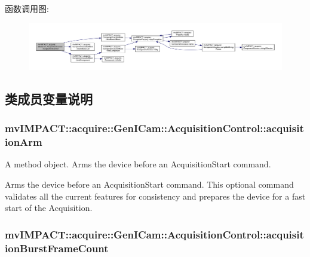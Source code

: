 函数调用图\+:
\nopagebreak
\begin{figure}[H]
\begin{center}
\leavevmode
\includegraphics[width=350pt]{classmv_i_m_p_a_c_t_1_1acquire_1_1_gen_i_cam_1_1_acquisition_control_a66a96d4ef8ec636ed0830bb8e5c94ca8_cgraph}
\end{center}
\end{figure}




\subsection{类成员变量说明}
\hypertarget{classmv_i_m_p_a_c_t_1_1acquire_1_1_gen_i_cam_1_1_acquisition_control_a05def6315f448a15576cb0746f791b26}{
\subsubsection[{acquisition\+Arm}]{ mv\+I\+M\+P\+A\+C\+T\+::acquire\+::\+Gen\+I\+Cam\+::\+Acquisition\+Control\+::acquisition\+Arm}}\label{classmv_i_m_p_a_c_t_1_1acquire_1_1_gen_i_cam_1_1_acquisition_control_a05def6315f448a15576cb0746f791b26}


A method object. Arms the device before an Acquisition\+Start command. 

Arms the device before an Acquisition\+Start command. This optional command validates all the current features for consistency and prepares the device for a fast start of the Acquisition. \hypertarget{classmv_i_m_p_a_c_t_1_1acquire_1_1_gen_i_cam_1_1_acquisition_control_ae206f145121c4fd3adfb0f47a9a917ea}{
\subsubsection[{acquisition\+Burst\+Frame\+Count}]{ mv\+I\+M\+P\+A\+C\+T\+::acquire\+::\+Gen\+I\+Cam\+::\+Acquisition\+Control\+::acquisition\+Burst\+Frame\+Count}}\label{classmv_i_m_p_a_c_t_1_1acquire_1_1_gen_i_cam_1_1_acquisition_control_ae206f145121c4fd3adfb0f47a9a917ea}


